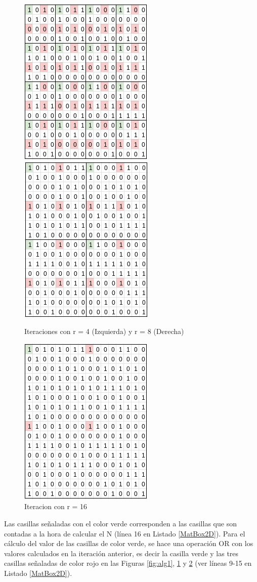 \begin{figure}[H]
    \centering
    \includegraphics[width=.24\textwidth]{img/ejemploAlgoritmo3.jpeg}
    \includegraphics[width=.24\textwidth]{img/ejemploAlgoritmo4.jpeg}
    \caption{Iteraciones con r = 4 (Izquierda) y r = 8 (Derecha)}
    \label{fig:alg2}
\end{figure}

\begin{figure}[H]
    \centering
    \includegraphics[width=.24\textwidth]{img/ejemploAlgoritmo5.jpeg}
    \caption{Iteracion con r = 16}
    \label{fig:alg3}
\end{figure}


Las casillas señaladas con el color verde corresponden a las casillas que son contadas a la hora de calcular el N (línea 16 en Listado \ref{MatBox2D}). Para el cálculo del valor de las casillas de color verde, se hace una operación OR con los valores calculados en la iteración anterior, es decir la casilla verde y las tres casillas señaladas de color rojo en las Figuras \ref{fig:alg1}, \ref{fig:alg2} y \ref{fig:alg3} (ver líneas 9-15 en Listado \ref{MatBox2D}).